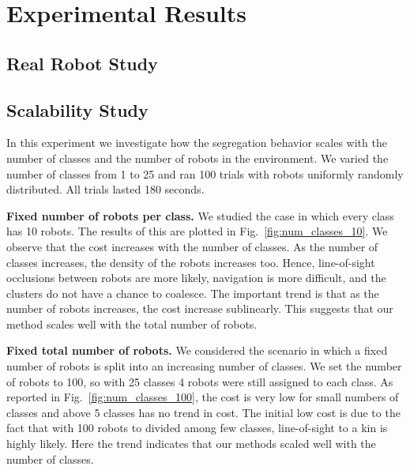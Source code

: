 \documentclass[letterpaper, 10 pt, conference]{ieeeconf}
\newcommand{\myparagraph}[1]{\textbf{#1.}}
\begin{document}
  \section{Experimental Results}

  \subsection{Real Robot Study} \label{section:real_robots}
  \subsection{Scalability Study} \label{section:scalability}

  In this experiment we investigate how the segregation behavior scales with the
  number of classes and the number of robots in the environment. We varied the
  number of classes from 1 to 25 and ran 100 trials with robots uniformly randomly
  distributed. All trials lasted 180 seconds.

  \myparagraph{Fixed number of robots per class}
  We studied the case in which every class has 10 robots. The results of this are
  plotted in Fig.~\ref{fig:num_classes_10}. We observe that the cost increases
  with the number of classes. As the number of classes increases,
  the density of the robots increases too. Hence, line-of-sight occlusions between robots are more likely,
  navigation is more difficult, and the clusters do not have a chance to coalesce.
  The important trend is that as the number of robots increases, the cost increase sublinearly.
  This suggests that our method scales well with the total number of robots.

  \myparagraph{Fixed total number of robots}
  We considered the scenario in which a fixed number of robots is split into an
  increasing number of classes. We set the number of robots to 100, so with 25
  classes 4 robots were still assigned to each class. As reported in
  Fig.~\ref{fig:num_classes_100}, the cost is very low for small numbers of classes
  and above 5 classes has no trend in cost. The initial low cost is due to the fact that
  with 100 robots to divided among few classes, line-of-sight to a kin is highly likely.
  Here the trend indicates that our methods scaled well with the number of classes.
\end{document}
